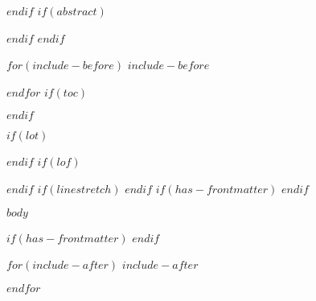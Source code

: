 \documentclass[
$if(fontsize)$
  $fontsize$,
$endif$
$if(lang)$
  $babel-lang$,
$endif$
$if(papersize)$
  $papersize$paper,
$endif$
$for(classoption)$
  $classoption$$sep$,
$endfor$
]{$documentclass$}
\begin{document}
$endif$
$if(abstract)$
\begin{abstract}
$abstract$
\end{abstract}
$endif$
$endif$

$for(include-before)$
$include-before$

$endfor$
$if(toc)$

\ifstrequal{$lang$}{en-us}{
	\renewcommand*\contentsname{Table of Contents}
}{	
	\renewcommand*\contentsname{Inhaltsverzeichnis}
}



\setcounter{tocdepth}{$toc-depth$}
\tableofcontents
\newpage

$endif$

$if(lot)$
\listoftables

$endif$
$if(lof)$
\listoffigures

$endif$
$if(linestretch)$
$endif$
$if(has-frontmatter)$
\mainmatter
$endif$
\newpage
{}

$body$

$if(has-frontmatter)$
\backmatter
$endif$

$for(include-after)$
$include-after$

$endfor$
\end{document}
